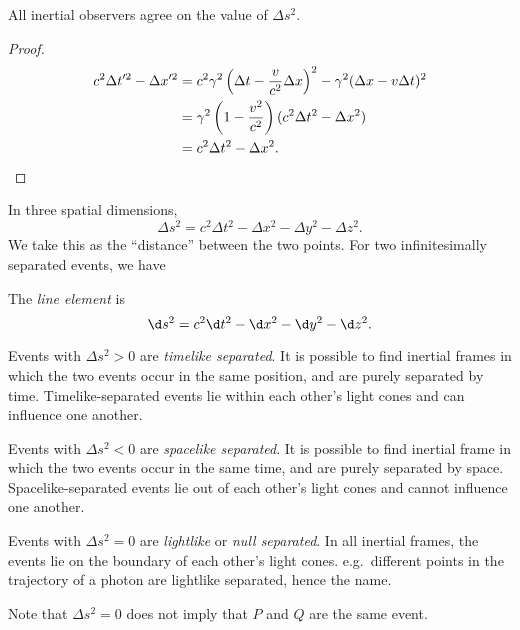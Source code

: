 \documentclass[a4paper]{article}
\begin{document}
\begin{prop}
  All inertial observers agree on the value of $\Delta s^2$.
\end{prop}

\begin{proof}
  \begin{align*}
    c^2 \Delta t'^2 - \Delta x'^2 &= c^2 \gamma^2 \left(\Delta t - \frac{v}{c^2}\Delta x\right)^2 - \gamma^2 (\Delta x - v\Delta t)^2\\
    &= \gamma^2 \left(1 - \frac{v^2}{c^2}\right)(c^2 \Delta t^2 - \Delta x^2)\\
    &= c^2\Delta t^2 - \Delta x^2.\qedhere
  \end{align*}
\end{proof}

In three spatial dimensions,
\[
  \Delta s^2 = c^2\Delta t^2 - \Delta x^2 - \Delta y^2 - \Delta z^2.
\]
We take this as the ``distance'' between the two points. For two infinitesimally separated events, we have
\begin{defi}
  The \emph{line element} is
  \[
    \d s^2 = c^2 \d t^2 - \d x^2 - \d y^2 - \d z^2.
  \]
\end{defi}

\begin{defi}
  Events with $\Delta s^2 > 0$ are \emph{timelike separated}. It is possible to find inertial frames in which the two events occur in the same position, and are purely separated by time. Timelike-separated events lie within each other's light cones and can influence one another.

  Events with $\Delta s^2 < 0$ are \emph{spacelike separated}. It is possible to find inertial frame in which the two events occur in the same time, and are purely separated by space. Spacelike-separated events lie out of each other's light cones and cannot influence one another.

  Events with $\Delta s^2 = 0$ are \emph{lightlike} or \emph{null separated}. In all inertial frames, the events lie on the boundary of each other's light cones. e.g.\ different points in the trajectory of a photon are lightlike separated, hence the name.
\end{defi}
Note that $\Delta s^2 = 0$ does not imply that $P$ and $Q$ are the same event.
\end{document}
